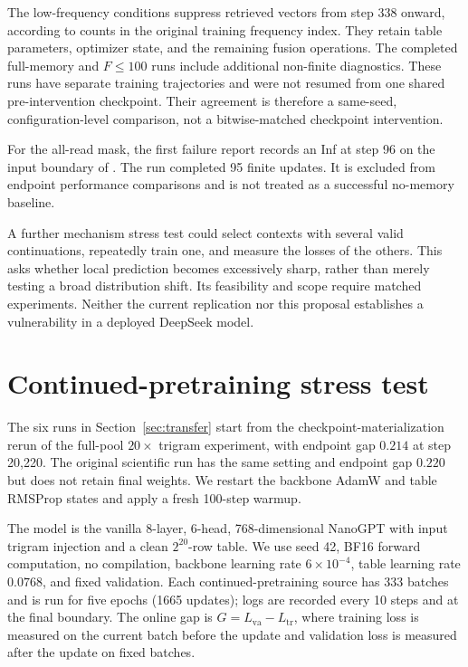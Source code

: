 The low-frequency conditions suppress retrieved vectors from step 338 onward, according to counts in the original training frequency index. They retain table parameters, optimizer state, and the remaining fusion operations. The completed full-memory and $F\leq100$ runs include additional non-finite diagnostics. These runs have separate training trajectories and were not resumed from one shared pre-intervention checkpoint. Their agreement is therefore a same-seed, configuration-level comparison, not a bitwise-matched checkpoint intervention.

For the all-read mask, the first failure report records an Inf at step 96 on the input boundary of . The run completed 95 finite updates. It is excluded from endpoint performance comparisons and is not treated as a successful no-memory baseline.

A further mechanism stress test could select contexts with several valid continuations, repeatedly train one, and measure the losses of the others. This asks whether local prediction becomes excessively sharp, rather than merely testing a broad distribution shift. Its feasibility and scope require matched experiments. Neither the current replication nor this proposal establishes a vulnerability in a deployed DeepSeek model.


\section{Continued-pretraining stress test}
\label{app:sft}

The six runs in Section~\ref{sec:transfer} start from the checkpoint-materialization rerun of the full-pool $20\times$ trigram experiment, with endpoint gap $0.214$ at step 20,220. The original scientific run has the same setting and endpoint gap $0.220$ but does not retain final weights. We restart the backbone AdamW and table RMSProp states and apply a fresh 100-step warmup.

The model is the vanilla 8-layer, 6-head, 768-dimensional NanoGPT with input trigram injection and a clean $2^{20}$-row table. We use seed 42, BF16 forward computation, no compilation, backbone learning rate $6\times10^{-4}$, table learning rate $0.0768$, and fixed validation. Each continued-pretraining source has 333 batches and is run for five epochs (1665 updates); logs are recorded every 10 steps and at the final boundary. The online gap is $G=L_{\mathrm{va}}-L_{\mathrm{tr}}$, where training loss is measured on the current batch before the update and validation loss is measured after the update on fixed batches.

